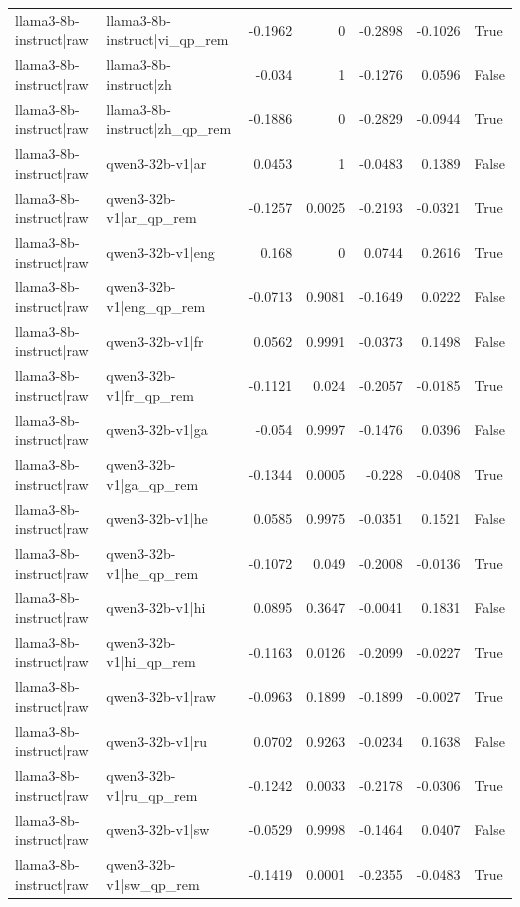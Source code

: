 \begin{table}
\begin{tabular}{l l r r r r l}
llama3-8b-instruct|raw & llama3-8b-instruct|vi_qp_rem & -0.1962 & 0 & -0.2898 & -0.1026 & True \\
llama3-8b-instruct|raw & llama3-8b-instruct|zh & -0.034 & 1 & -0.1276 & 0.0596 & False \\
llama3-8b-instruct|raw & llama3-8b-instruct|zh_qp_rem & -0.1886 & 0 & -0.2829 & -0.0944 & True \\
llama3-8b-instruct|raw & qwen3-32b-v1|ar & 0.0453 & 1 & -0.0483 & 0.1389 & False \\
llama3-8b-instruct|raw & qwen3-32b-v1|ar_qp_rem & -0.1257 & 0.0025 & -0.2193 & -0.0321 & True \\
llama3-8b-instruct|raw & qwen3-32b-v1|eng & 0.168 & 0 & 0.0744 & 0.2616 & True \\
llama3-8b-instruct|raw & qwen3-32b-v1|eng_qp_rem & -0.0713 & 0.9081 & -0.1649 & 0.0222 & False \\
llama3-8b-instruct|raw & qwen3-32b-v1|fr & 0.0562 & 0.9991 & -0.0373 & 0.1498 & False \\
llama3-8b-instruct|raw & qwen3-32b-v1|fr_qp_rem & -0.1121 & 0.024 & -0.2057 & -0.0185 & True \\
llama3-8b-instruct|raw & qwen3-32b-v1|ga & -0.054 & 0.9997 & -0.1476 & 0.0396 & False \\
llama3-8b-instruct|raw & qwen3-32b-v1|ga_qp_rem & -0.1344 & 0.0005 & -0.228 & -0.0408 & True \\
llama3-8b-instruct|raw & qwen3-32b-v1|he & 0.0585 & 0.9975 & -0.0351 & 0.1521 & False \\
llama3-8b-instruct|raw & qwen3-32b-v1|he_qp_rem & -0.1072 & 0.049 & -0.2008 & -0.0136 & True \\
llama3-8b-instruct|raw & qwen3-32b-v1|hi & 0.0895 & 0.3647 & -0.0041 & 0.1831 & False \\
llama3-8b-instruct|raw & qwen3-32b-v1|hi_qp_rem & -0.1163 & 0.0126 & -0.2099 & -0.0227 & True \\
llama3-8b-instruct|raw & qwen3-32b-v1|raw & -0.0963 & 0.1899 & -0.1899 & -0.0027 & True \\
llama3-8b-instruct|raw & qwen3-32b-v1|ru & 0.0702 & 0.9263 & -0.0234 & 0.1638 & False \\
llama3-8b-instruct|raw & qwen3-32b-v1|ru_qp_rem & -0.1242 & 0.0033 & -0.2178 & -0.0306 & True \\
llama3-8b-instruct|raw & qwen3-32b-v1|sw & -0.0529 & 0.9998 & -0.1464 & 0.0407 & False \\
llama3-8b-instruct|raw & qwen3-32b-v1|sw_qp_rem & -0.1419 & 0.0001 & -0.2355 & -0.0483 & True \\

\end{tabular}
\end{table}
